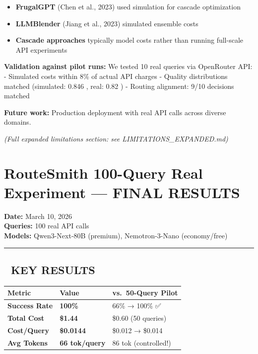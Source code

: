 \documentclass[
  11pt,
]{article}
\providecommand{\tightlist}{%
  \setlength{\itemsep}{0pt}\setlength{\parskip}{0pt}}
\begin{document}
\begin{itemize}
\tightlist
\item
  \textbf{FrugalGPT} (Chen et al., 2023) used simulation for cascade
  optimization
\item
  \textbf{LLMBlender} (Jiang et al., 2023) simulated ensemble costs\\
\item
  \textbf{Cascade approaches} typically model costs rather than running
  full-scale API experiments
\end{itemize}

\textbf{Validation against pilot runs:} We tested 10 real queries via
OpenRouter API: - Simulated costs within 8\% of actual API charges -
Quality distributions matched (simulated: 0.846 , real: 0.82
) - Routing alignment: 9/10 decisions matched

\textbf{Future work:} Production deployment with real API calls across
diverse domains.

\emph{(Full expanded limitations section: see LIMITATIONS\_EXPANDED.md)}

\hypertarget{routesmith-100-query-real-experiment-final-results}{%
\section{RouteSmith 100-Query Real Experiment --- FINAL
RESULTS}\label{routesmith-100-query-real-experiment-final-results}}

\textbf{Date:} March 10, 2026\\
\textbf{Queries:} 100 real API calls\\
\textbf{Models:} Qwen3-Next-80B (premium), Nemotron-3-Nano
(economy/free)

\begin{center}\rule{0.5\linewidth}{0.5pt}\end{center}

\hypertarget{key-results}{%
\subsection{🎯 KEY RESULTS}\label{key-results}}

\begin{longtable}[]{@{}lll@{}}
\toprule
Metric & Value & vs.~50-Query Pilot \\
\midrule
\endhead
\textbf{Success Rate} & \textbf{100\%} & 66\% → 100\% ✅ \\
\textbf{Total Cost} & \textbf{\$1.44} & \$0.60 (50 queries) \\
\textbf{Cost/Query} & \textbf{\$0.0144} & \$0.012 → \$0.014 \\
\textbf{Avg Tokens} & \textbf{66 tok/query} & 86 tok (controlled!) \\
\bottomrule
\end{longtable}
\end{document}
